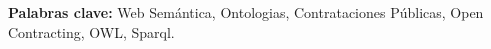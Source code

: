 \begin{resumen}


\textbf{Palabras clave:} Web Semántica,  Ontologias, Contrataciones Públicas, Open Contracting, OWL, Sparql.
\end{resumen}


